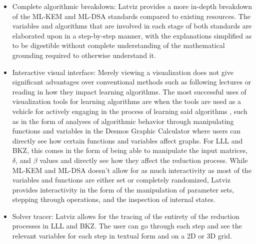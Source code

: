 \begin{itemize}
	\item Complete algorithmic breakdown: Latviz provides a more in-depth breakdown of the ML-KEM and ML-DSA standards compared to existing resources. The variables and algorithms that are involved in each stage of both standards are elaborated upon in a step-by-step manner, with the explanations simplified as to be digestible without complete understanding of the mathematical grounding required to otherwise understand it.
	\item Interactive visual interface: Merely viewing a visualization does not give significant advantages over conventional methods such as following lectures or reading in how they impact learning algorithms. The most successful uses of visualization tools for learning algorithms are when the tools are used as a vehicle for actively engaging in the process of learning said algorithms \cite{HUNDHAUSEN2002259}, such as in the form of analyses of algorithmic behavior through manipulating functions and variables in the Desmos Graphic Calculator where users can directly see how certain functions and variables affect graphs. For LLL and BKZ, this comes in the form of being able to manipulate the input matrices, $\delta$, and $\beta$ values and directly see how they affect the reduction process. While ML-KEM and ML-DSA doesn’t allow for as much interactivity as most of the variables and functions are either set or completely randomized, Latviz provides interactivity in the form of the manipulation of parameter sets, stepping through operations, and the inspection of internal states.
	\item Solver tracer: Latviz allows for the tracing of the entirety of the reduction processes in LLL and BKZ. The user can go through each step and see the relevant variables for each step in textual form and on a 2D or 3D grid.
\end{itemize}


